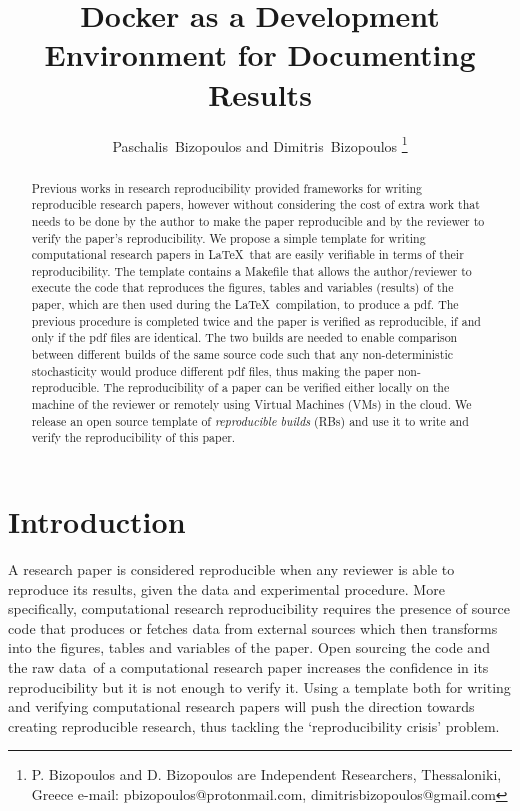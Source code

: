 \documentclass[journal]{IEEEtran}
\begin{document}

\title{Docker as a Development Environment for Documenting Results}

\author{Paschalis~Bizopoulos and Dimitris~Bizopoulos
\thanks{P. Bizopoulos and D. Bizopoulos are Independent Researchers, Thessaloniki, Greece e-mail: pbizopoulos@protonmail.com, dimitrisbizopoulos@gmail.com}}

\maketitle

\begin{abstract}
	Previous works in research reproducibility provided frameworks for writing reproducible research papers, however without considering the cost of extra work that needs to be done by the author to make the paper reproducible and by the reviewer to verify the paper's reproducibility.
	We propose a simple template for writing computational research papers in \LaTeX\ that are easily verifiable in terms of their reproducibility.
	The template contains a Makefile that allows the author/reviewer to execute the code that reproduces the figures, tables and variables (results) of the paper, which are then used during the \LaTeX\ compilation, to produce a pdf.
	The previous procedure is completed twice and the paper is verified as reproducible, if and only if the pdf files are identical.
	The two builds are needed to enable comparison between different builds of the same source code such that any non-deterministic stochasticity would produce different pdf files, thus making the paper non-reproducible.
	The reproducibility of a paper can be verified either locally on the machine of the reviewer or remotely using Virtual Machines (VMs) in the cloud.
	We release an open source template of \textit{reproducible builds} (RBs) and use it to write and verify the reproducibility of this paper.
\end{abstract}

\section{Introduction}
A research paper is considered reproducible when any reviewer is able to reproduce its results, given the data and experimental procedure.
More specifically, computational research reproducibility requires the presence of source code that produces or fetches data from external sources which then transforms into the figures, tables and variables of the paper.
Open sourcing the code and the raw data of a computational research paper increases the confidence in its reproducibility but it is not enough to verify it.
Using a template both for writing and verifying computational research papers will push the direction towards creating reproducible research, thus tackling the `reproducibility crisis' problem.
\end{document}
